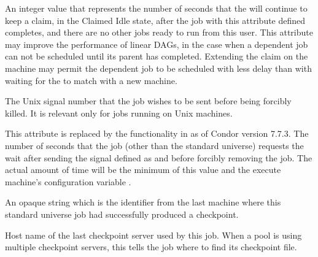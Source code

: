 \begin{description}
\item[\AdAttr{KeepClaimIdle}:]  An integer value that represents the number
of seconds that the  will continue to keep a claim,
in the Claimed Idle state,
after the job with this attribute defined completes, 
and there are no other jobs ready to run from this user.
This attribute may improve the performance of linear DAGs,
in the case when a dependent job can not be scheduled until its
parent has completed.
Extending the claim on the machine may permit the dependent job to be
scheduled with less delay than with waiting for the 
to match with a new machine. 

\item[\AdAttr{KillSig}:]  The Unix signal number that the job wishes to be
sent before being forcibly killed.
It is relevant only for jobs running on Unix machines.

\item[\AdAttr{KillSigTimeout}:]  This attribute is replaced by the
functionality in  as of Condor version 7.7.3.
The number of seconds that the job
(other than the standard universe) requests the  wait
after sending the signal defined as  and before forcibly
removing the job.
The actual amount of time will be the minimum of this value
and the execute machine's configuration variable .

\item[\AdAttr{LastCheckpointPlatform}:]  An opaque string which is the
 identifier from the last machine where this
standard universe job had successfully produced a checkpoint.

\item[\AdAttr{LastCkptServer}:]  Host name of the last checkpoint
server used by this job.  When a pool is using multiple checkpoint
servers, this tells the job where to find its checkpoint file.


\end{description}
